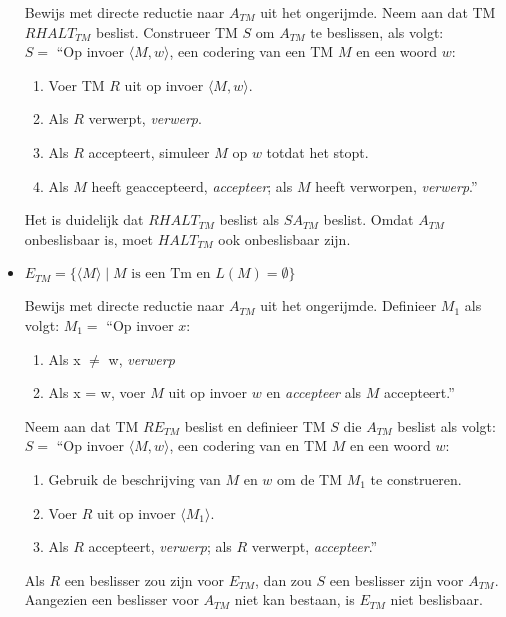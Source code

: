 \documentclass[]{article}
\begin{document}
\begin{itemize}
	Bewijs met directe reductie naar $A_{TM}$ uit het ongerijmde.
	Neem aan dat TM $R HALT_{TM}$ beslist. Construeer TM $S$ om $A_{TM}$ te beslissen, als volgt: \\
	$S = $ ``Op invoer $\langle M, w \rangle$, een codering van een TM $M$ en een woord $w$:
	\begin{enumerate}
		\item Voer TM $R$ uit op invoer $\langle M, w \rangle$.
		\item Als $R$ verwerpt, \emph{verwerp}.
		\item Als $R$ accepteert, simuleer $M$ op $w$ totdat het stopt.
		\item Als $M$ heeft geaccepteerd, \emph{accepteer}; als $M$ heeft verworpen, \emph{verwerp}.''
	\end{enumerate}
	Het is duidelijk dat $R HALT_{TM}$ beslist als $S A_{TM}$ beslist. Omdat $A_{TM}$ onbeslisbaar is, moet $HALT_{TM}$ ook onbeslisbaar zijn.
	
	
	\item $E_{TM} = \{ \langle M \rangle \mid M \mbox{ is een Tm en } L(M) = \emptyset \}$
	
	Bewijs met directe reductie naar $A_{TM}$ uit het ongerijmde.	
	Definieer $M_1$ als volgt:
	$M_1 = $ ``Op invoer $x$: \\
	\begin{enumerate}
		\item Als x $\neq$ w, \emph{verwerp}
		\item Als x = w, voer $M$ uit op invoer $w$ en \emph{accepteer} als $M$ accepteert.''
	\end{enumerate}
	
	Neem aan dat TM $R E_{TM}$ beslist en definieer TM $S$ die $A_{TM}$ beslist als volgt: \\
	$S = $ ``Op invoer $\langle M, w \rangle$, een codering van en TM $M$ en een woord $w$:
	\begin{enumerate}
		\item	 Gebruik de beschrijving van $M$ en $w$ om de TM $M_1$ te construeren.
		\item Voer $R$ uit op invoer $\langle M_1 \rangle$.
		\item Als $R$ accepteert, \emph{verwerp}; als $R$ verwerpt, \emph{accepteer}.''
	\end{enumerate}
	Als $R$ een beslisser zou zijn voor $E_{TM}$, dan zou $S$ een beslisser zijn voor $A_{TM}$. Aangezien een beslisser voor $A_{TM}$ niet kan bestaan, is $E_{TM}$ niet beslisbaar.
	

\end{itemize}
\end{document}

